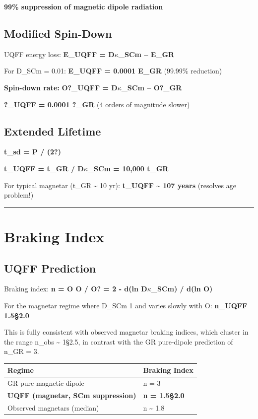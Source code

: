 \documentclass[12pt,a4paper]{article}
\begin{document}
\textbf{99\% suppression of magnetic dipole radiation}

\subsection{Modified Spin-Down}

UQFF energy loss: \textbf{E\_UQFF = D$\kappa$\_SCm -- E\_GR}

For D\_SCm = 0.01: \textbf{E\_UQFF = 0.0001  E\_GR} (99.99\% reduction)

\textbf{Spin-down rate:} \textbf{O?\_UQFF = D$\kappa$\_SCm -- O?\_GR}

\textbf{?\_UQFF = 0.0001  ?\_GR} (4 orders of magnitude slower)

\subsection{Extended Lifetime}

\textbf{t\_sd = P / (2?)}

\textbf{t\_UQFF = t\_GR / D$\kappa$\_SCm = 10,000  t\_GR}

For typical magnetar (t\_GR \textasciitilde{} 10 yr): \textbf{t\_UQFF \textasciitilde{} 107 years} (resolves age problem!)

\medskip\hrule\medskip

\section{Braking Index}

\subsection{UQFF Prediction}

Braking index: \textbf{n = O O / O? = 2 - d(ln D$\kappa$\_SCm) / d(ln O)}

For the magnetar regime where D\_SCm  1 and varies slowly with O: \textbf{n\_UQFF  1.5\S{}2.0}

This is fully consistent with observed magnetar braking indices, which cluster in the range n\_obs \textasciitilde{} 1\S{}2.5, in contrast with the GR pure-dipole prediction of n\_GR = 3.

\begin{table}[H]
\centering
\small
\begin{tabularx}{\linewidth}{@{}>{\raggedright\arraybackslash}X>{\raggedright\arraybackslash}X@{}}
\toprule
Regime & Braking Index \tabularnewline
\midrule
GR pure magnetic dipole & n = 3 \tabularnewline
\textbf{UQFF (magnetar, SCm suppression)} & \textbf{n = 1.5\S{}2.0} \tabularnewline
Observed magnetars (median) & n \textasciitilde{} 1.8 \tabularnewline
\bottomrule
\end{tabularx}
\end{table}
\end{document}
